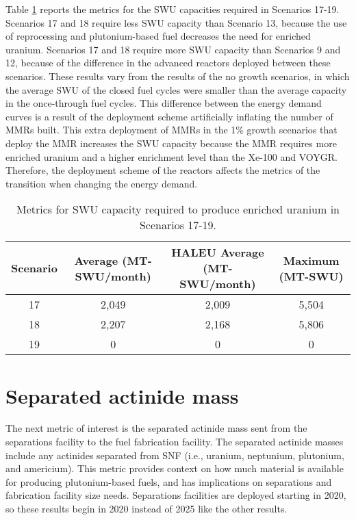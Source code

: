 Table \ref{tab:s17-19_swu} reports the metrics for the \gls{SWU} capacities 
required in Scenarios 17-19. Scenarios 17 and 18 require less 
\gls{SWU} capacity than Scenario 13, because the use of 
reprocessing and plutonium-based fuel decreases the need for 
enriched uranium. Scenarios 17 and 18 require more \gls{SWU} 
capacity than Scenarios 9 and 12, because of the difference in 
the advanced reactors deployed between these scenarios. These results 
vary from the results of the no growth scenarios, in which the 
average \gls{SWU} of the closed fuel cycles were smaller than the 
average capacity in the once-through fuel cycles. This difference 
between the energy demand curves is a result of the deployment 
scheme artificially inflating the number of \glspl{MMR} built. This 
extra deployment of \glspl{MMR} in the 1\% growth scenarios that 
deploy the \gls{MMR} increases the \gls{SWU} capacity because the 
\gls{MMR} requires more enriched uranium and a higher enrichment 
level than the Xe-100 and VOYGR. Therefore, the deployment scheme 
of the reactors affects the metrics of the transition when changing 
the energy demand. 

\begin{table}[h!]
    \centering 
    \caption{Metrics for \gls{SWU} capacity required to produce 
    enriched uranium in Scenarios 17-19.}
    \label{tab:s17-19_swu}
    \begin{tabular}{c c c c}
        \hline 
        Scenario & Average (MT-SWU/month) & HALEU Average (MT-SWU/month)
         & Maximum (MT-SWU) \\
        \hline 
        17 & 2,049 & 2,009 & 5,504 \\
        18 & 2,207 & 2,168 & 5,806 \\
        19 & 0 & 0 & 0 \\
        \hline
        
    \end{tabular}
\end{table}

\section{Separated actinide mass}
The next metric of interest is the separated actinide mass sent 
from the separations facility to the fuel fabrication facility. 
The separated actinide masses include any actinides separated 
from \gls{SNF} (i.e., uranium, neptunium, plutonium, and 
americium). 
This metric provides context on how much material is available for 
producing plutonium-based fuels, and has implications on 
separations and fabrication facility size needs. Separations facilities 
are deployed starting in 2020, so these results begin in 2020 instead 
of 2025 like the other results. 

